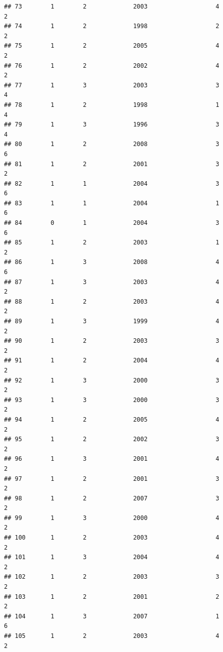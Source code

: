 \documentclass[
]{article}
\begin{document}
\begin{verbatim}
## 73        1        2             2003                   4                 2
## 74        1        2             1998                   2                 2
## 75        1        2             2005                   4                 2
## 76        1        2             2002                   4                 2
## 77        1        3             2003                   3                 4
## 78        1        2             1998                   1                 4
## 79        1        3             1996                   3                 4
## 80        1        2             2008                   3                 6
## 81        1        2             2001                   3                 2
## 82        1        1             2004                   3                 6
## 83        1        1             2004                   1                 6
## 84        0        1             2004                   3                 6
## 85        1        2             2003                   1                 2
## 86        1        3             2008                   4                 6
## 87        1        3             2003                   4                 2
## 88        1        2             2003                   4                 2
## 89        1        3             1999                   4                 2
## 90        1        2             2003                   3                 2
## 91        1        2             2004                   4                 2
## 92        1        3             2000                   3                 2
## 93        1        3             2000                   3                 2
## 94        1        2             2005                   4                 2
## 95        1        2             2002                   3                 2
## 96        1        3             2001                   4                 2
## 97        1        2             2001                   3                 2
## 98        1        2             2007                   3                 2
## 99        1        3             2000                   4                 2
## 100       1        2             2003                   4                 2
## 101       1        3             2004                   4                 2
## 102       1        2             2003                   3                 2
## 103       1        2             2001                   2                 2
## 104       1        3             2007                   1                 6
## 105       1        2             2003                   4                 2

\end{verbatim}
\end{document}
